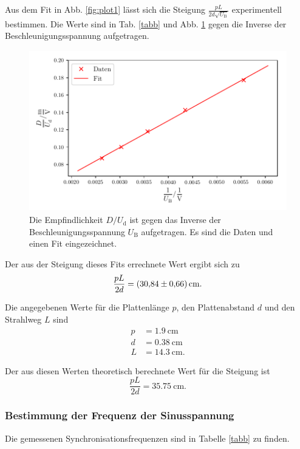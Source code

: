 \noindent Aus dem Fit in Abb. \ref{fig:plot1} lässt sich die Steigung  
$\frac{p L}{2 d \sqrt{U_\text{B}}}$ experimentell bestimmen.
Die Werte sind in Tab. \ref{tabb} und Abb. \ref{fig:plot5} gegen die Inverse der Beschleunigungsspannung aufgetragen.



\begin{figure}
    \centering
    \includegraphics[width=12cm, height=7cm]{build/plot5.pdf}
    \caption{Die Empfindlichkeit $D/U_\text{d}$ ist gegen das Inverse der Beschleunigungsspannung $U_\text{B}$ aufgetragen. Es sind die Daten und einen Fit eingezeichnet.}
    \label{fig:plot5}
\end{figure}

\noindent Der aus der Steigung dieses Fits errechnete Wert ergibt sich zu
\begin{equation*}
    \frac{p L}{2 d} = \SI{30.84 \pm 0.66}{\centi\meter}.
\end{equation*}

\noindent Die angegebenen Werte für die Plattenlänge $p$,
den Plattenabstand $d$ und den Strahlweg $L$ sind
\begin{align*}
    p &= \SI{1.9}{\centi\meter} \\
    d &= \SI{0.38}{\centi\meter} \\
    L &= \SI{14.3}{\centi\meter}.
\end{align*}

\noindent Der aus diesen Werten theoretisch berechnete Wert für die
Steigung ist
\begin{equation*}
    \frac{p L}{2 d} = \SI{35.75}{\centi\meter}.
\end{equation*}

\subsubsection{Bestimmung der Frequenz der Sinusspannung}
Die gemessenen Synchronisationsfrequenzen sind in Tabelle
\ref{tabb} zu finden. 


